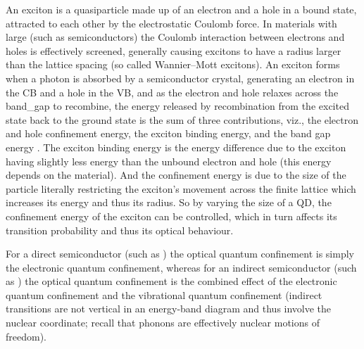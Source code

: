 \documentclass[draft,webedition,openright,titles,swedish,english]{LuaUUThesis}\usepackage[]{graphicx}\usepackage[]{xcolor}
\newcommand{\viz}{viz.}
\newcommand{\namely}{\viz}
\begin{document}
An exciton is a quasiparticle made up of an electron and a hole in a bound state,
attracted to each other by the electrostatic Coulomb force.
In materials with large 
(such as semiconductors) the Coulomb interaction between electrons and holes
is effectively screened, generally causing excitons to have a radius larger than
the lattice spacing (so called Wannier--Mott excitons).
An exciton forms when a photon is absorbed by a semiconductor crystal,
generating an electron in the \gls{CB} and a hole in the \gls{VB},
and as the electron and hole relaxes across the \gls{band_gap} to recombine, the
energy released by recombination from the excited state back to the ground state
is the sum of three contributions, \namely,
the electron and hole confinement energy,
the exciton binding energy,
and the band gap energy \cite{Abdellah2015}.
%
The exciton binding energy is the energy difference due to the exciton
having slightly less energy than the unbound electron and hole
(this energy depends on the material).
And the confinement energy is due to the size of the particle literally
restricting the exciton's movement across the finite lattice which increases
its energy and thus its radius.
So by varying the size of a \gls{QD}, the confinement energy of the exciton
can be controlled, which in turn affects its transition probability and thus
its optical behaviour.

For a direct semiconductor (such as \ZnO) the optical quantum confinement is simply
the electronic quantum confinement, whereas for an indirect semiconductor (such as \hematite)
the optical quantum confinement is the combined effect of the electronic quantum confinement
and the vibrational quantum confinement \cite{Edvinsson2018}
(indirect transitions are not vertical in an energy-band diagram and thus involve
the nuclear coordinate; recall that phonons are effectively nuclear motions of freedom).
\end{document}
